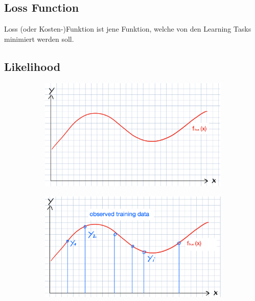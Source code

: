 \documentclass[a4paper]{article}
\begin{document}
		\newpage
		
		\subsection{Loss Function}
		
		Loss (oder Kosten-)Funktion ist jene Funktion, welche von den Learning Tasks minimiert werden soll.
		
		\subsection{Likelihood}
		
		\begin{figure}[htb!]
			\centering
			\begin{subfigure}[b]{0.475\textwidth}
				\centering
				\includegraphics[width=\textwidth]{img/05_neuronal_networks/likelihood_01.png}
			\end{subfigure}
			\hfill
			\begin{subfigure}[b]{0.475\textwidth}
				\centering
				\includegraphics[width=\textwidth]{img/05_neuronal_networks/likelihood_02.png}

\end{subfigure}
\end{figure}
\end{document}
